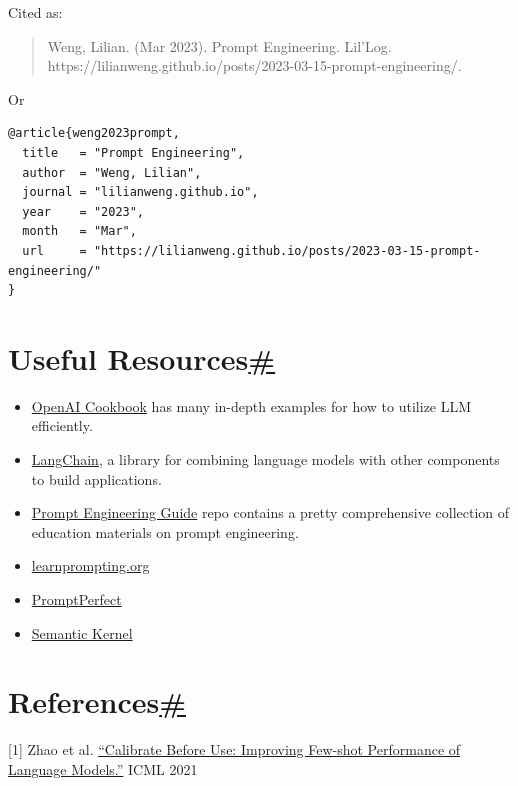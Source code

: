 Cited as:

\begin{quote}
Weng, Lilian. (Mar 2023). Prompt Engineering. Lil'Log. https://lilianweng.github.io/posts/2023-03-15-prompt-engineering/.
\end{quote}

Or

\begin{verbatim}
@article{weng2023prompt,
  title   = "Prompt Engineering",
  author  = "Weng, Lilian",
  journal = "lilianweng.github.io",
  year    = "2023",
  month   = "Mar",
  url     = "https://lilianweng.github.io/posts/2023-03-15-prompt-engineering/"
}
\end{verbatim}

\section{\texorpdfstring{Useful Resources\hyperref[useful-resources]{\#}}{Useful Resources\#}}\label{useful-resources}

\begin{itemize}
\tightlist
\item
  \href{https://github.com/openai/openai-cookbook}{OpenAI Cookbook} has many in-depth examples for how to utilize LLM efficiently.
\item
  \href{https://langchain.readthedocs.io/en/latest/}{LangChain}, a library for combining language models with other components to build applications.
\item
  \href{https://github.com/dair-ai/Prompt-Engineering-Guide}{Prompt Engineering Guide} repo contains a pretty comprehensive collection of education materials on prompt engineering.
\item
  \href{https://learnprompting.org/docs/intro}{learnprompting.org}
\item
  \href{https://promptperfect.jina.ai}{PromptPerfect}
\item
  \href{https://github.com/microsoft/semantic-kernel}{Semantic Kernel}
\end{itemize}

\section{\texorpdfstring{References\hyperref[references]{\#}}{References\#}}\label{references}

{[}1{]} Zhao et al. \href{https://arxiv.org/abs/2102.09690}{``Calibrate Before Use: Improving Few-shot Performance of Language Models.''} ICML 2021

